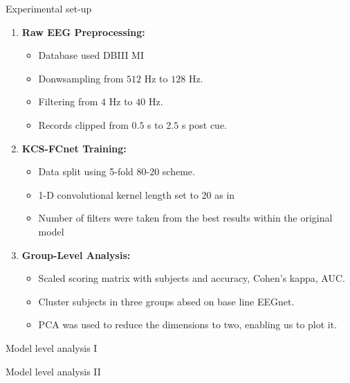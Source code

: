 \documentclass[aspectratio=169]{beamer}
\let\oldcite\cite %
\renewcommand{\cite}[1]{{\tiny\oldcite{#1}}}
\begin{document}
\begin{frame}{Experimental set-up}
    \begin{enumerate}
        \item \textbf{Raw EEG Preprocessing:} 
        \begin{itemize}
            \item Database used DBIII MI
            \item Donwsampling from $512$ Hz to $128$ Hz. 
            \item Filtering from $4$ Hz to $40$ Hz. 
            \item Records clipped from $0.5$ s to $2.5$ s post cue.
        \end{itemize}
        \item \textbf{KCS-FCnet Training:}
        \begin{itemize}
            \item Data split using 5-fold 80-20 scheme.
            \item 1-D convolutional kernel length set to $20$ as in \cite{lawhern2018eegnet}
            \item Number of filters were taken from the best results within the original model
        \end{itemize}
        \item \textbf{Group-Level Analysis:}
        \begin{itemize}
            \item Scaled scoring matrix with subjects and accuracy, Cohen's kappa, AUC.
            \item Cluster subjects in three groups absed on base line EEGnet.
            \item PCA was used to reduce the dimensions to two, enabling us to plot it.
        \end{itemize}
    \end{enumerate}
\end{frame}


\begin{frame}{Model level analysis I} 
        \centering
        \resizebox{0.7\linewidth}{!}{}
\end{frame}

\begin{frame}{Model level analysis II} 
    \centering
    \resizebox{0.7\linewidth}{!}{}
\end{frame}
\end{document}
